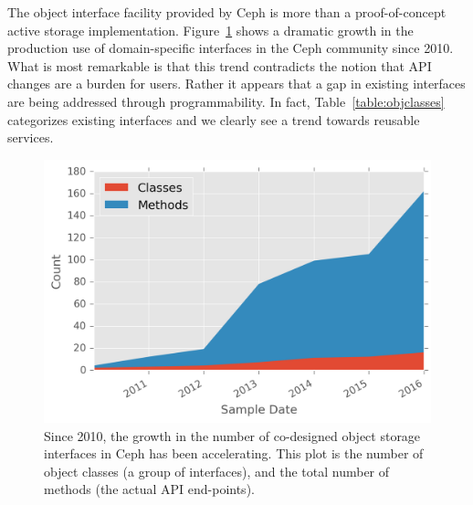 \documentclass[10pt,twocolumn]{article}
\begin{document}
The object interface facility provided by Ceph is more than
a proof-of-concept active storage implementation.  Figure~\ref{fig:obj-int-dev-growth} shows a dramatic growth in the production use of
domain-specific interfaces in the Ceph community since 2010.  What is most
remarkable is that this trend contradicts the notion that API changes are a
burden for users.
Rather it appears that a gap in existing interfaces are
being addressed through programmability. In fact, Table~\ref{table:objclasses}
categorizes existing interfaces and we clearly see a trend towards reusable
services.

\begin{figure}[ht]
\centering
\includegraphics{figures/obj-int-dev-growth.png}
\caption{Since 2010, the growth in the number of co-designed object
storage interfaces in Ceph has been accelerating. This plot is the
number of object classes (a group of interfaces), and the total number
of methods (the actual API end-points).}
\label{fig:obj-int-dev-growth}
\end{figure}
\end{document}
